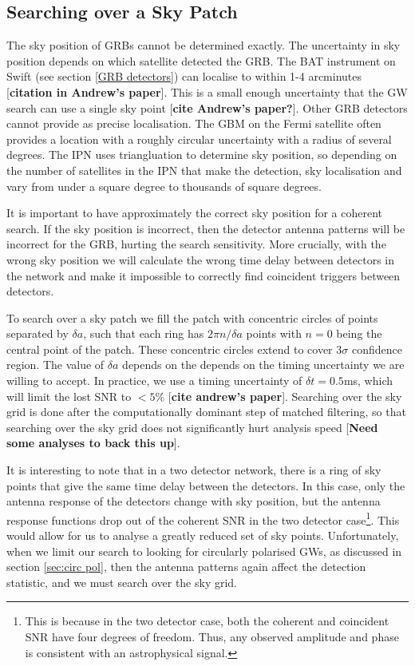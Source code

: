\documentclass[11pt]{cuthesis}
\begin{document}
\subsection{Searching over a Sky Patch}
The sky position of GRBs cannot be determined exactly. The uncertainty in sky position depends on which satellite detected the GRB. The BAT instrument on Swift (see section \ref{GRB detectors}) can localise to within 1-4 arcminutes [\textbf{citation in Andrew's paper}]. This is a small enough uncertainty that the GW search can use a single sky point [\textbf{cite Andrew's paper?}]. Other GRB detectors cannot provide as precise localisation. The GBM on the Fermi satellite often provides a location with a roughly circular uncertainty with a radius of several degrees. The IPN uses triangluation to determine sky position, so depending on the number of satellites in the IPN that make the detection, sky localisation and vary from under a square degree to thousands of square degrees. 

It is important to have approximately the correct sky position for a coherent search. If the sky position is incorrect, then the detector antenna patterns will be incorrect for the GRB, hurting the search sensitivity. More crucially, with the wrong sky position we will calculate the wrong time delay between detectors in the network and make it impossible to correctly find coincident triggers between detectors. 

To search over a sky patch we fill the patch with concentric circles of points separated by $\delta a$, such that each ring has $2\pi n / \delta a$ points with $n=0$ being the central point of the patch. These concentric circles extend to cover $3\sigma$ confidence region. The value of $\delta a$ depends on the depends on the timing uncertainty we are willing to accept. In practice, we use a timing uncertainty of $\delta t = 0.5$ms, which will limit the lost SNR to $<5\%$ [\textbf{cite andrew's paper}]. Searching over the sky grid is done after the computationally dominant step of matched filtering, so that searching over the sky grid does not significantly hurt analysis speed [\textbf{Need some analyses to back this up}].

It is interesting to note that in a two detector network, there is a ring of sky points that give the same time delay between the detectors. In this case, only the antenna response of the detectors change with sky position, but the antenna response functions drop out of the coherent SNR in the two detector case\footnote{This is because in the two detector case, both the coherent and coincident SNR have four degrees of freedom. Thus, any observed amplitude and phase is consistent with an astrophysical signal.}. This would allow for us to analyse a greatly reduced set of sky points. Unfortunately, when we limit our search to looking for circularly polarised GWs, as discussed in section \ref{sec:circ pol}, then the antenna patterns again affect the detection statistic, and we must search over the sky grid.
\end{document}
